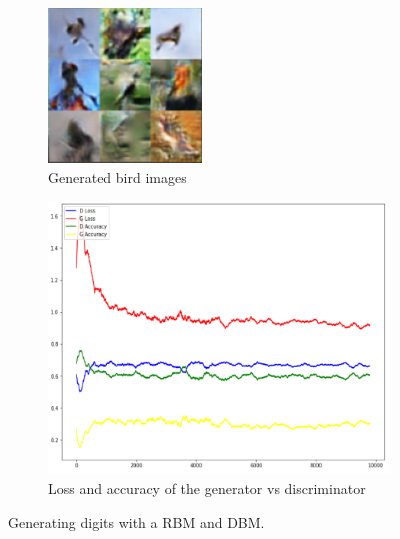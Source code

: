 \documentclass[a4paper,10pt]{article}
\begin{document}
\begin{figure}[h]
	\begin{subfigure}[b]{0.49\textwidth}
		\centering
		\includegraphics[width=0.6\linewidth]{birds.png}
		\caption{Generated bird images}
		\label{fig:birds}
	\end{subfigure}	 	
	\begin{subfigure}[b]{0.49\textwidth}
		\centering
		\includegraphics[width=0.8\linewidth]{GAN_acc.png}
		\caption{Loss and accuracy of the generator vs discriminator}
		\label{fig:GAN_accuracy}
	\end{subfigure}	
	\caption{Generating digits with a RBM and DBM.}
	\label{fig:compareDBM2}
\end{figure}
\end{document}
